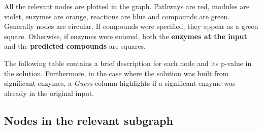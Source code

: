 \documentclass{article}\usepackage[]{graphicx}\usepackage[]{color}
\begin{document}
All the relevant nodes are plotted in the graph.
Pathways are red, modules are violet, enzymes are orange, reactions are blue and compounds are green. Generally nodes are circular. If compounds were specified, they appear as a green square. Otherwise, if enzymes were entered, both the \textbf{enzymes at the input} and the \textbf{predicted compounds} are squares.

The following table contains a brief description for each node and its p-value in the solution. Furthermore, in the case where the solution was built from significant enzymes, a \textit{Guess} column highlights if a significant enzyme was already in the original input. 

\subsection{Nodes in the relevant subgraph}
\end{document}

